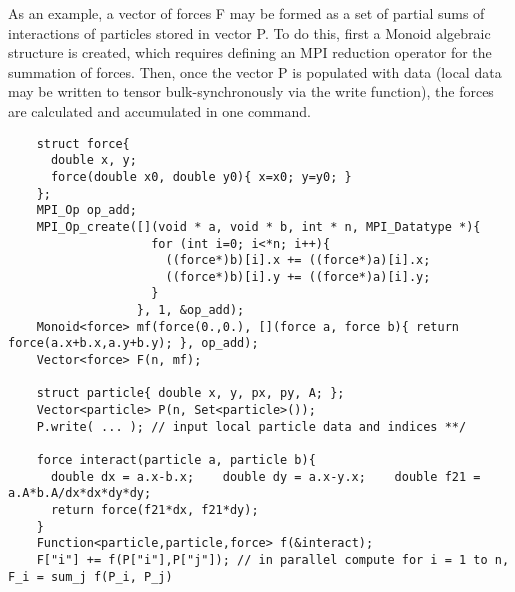 As an example, a vector of forces {\CD F} may be formed as a set of partial sums of interactions of particles stored in vector {\CD P}.
To do this, first a {\kwstyle Monoid} algebraic structure is created, which requires defining an MPI reduction operator for the summation of forces.
Then, once the vector {\CD P} is populated with data (local data may be written to tensor bulk-synchronously via the {\kwstyle write} function), the forces are calculated and accumulated in one command.
\begin{lstlisting}
    struct force{
      double x, y; 
      force(double x0, double y0){ x=x0; y=y0; }
    };
    MPI_Op op_add;
    MPI_Op_create([](void * a, void * b, int * n, MPI_Datatype *){
                    for (int i=0; i<*n; i++){
                      ((force*)b)[i].x += ((force*)a)[i].x;
                      ((force*)b)[i].y += ((force*)a)[i].y;
                    }
                  }, 1, &op_add);
    Monoid<force> mf(force(0.,0.), [](force a, force b){ return force(a.x+b.x,a.y+b.y); }, op_add);
    Vector<force> F(n, mf);
    
    struct particle{ double x, y, px, py, A; };
    Vector<particle> P(n, Set<particle>());
    P.write( ... ); // input local particle data and indices **/ 

    force interact(particle a, particle b){
      double dx = a.x-b.x;    double dy = a.x-y.x;    double f21 = a.A*b.A/dx*dx*dy*dy;
      return force(f21*dx, f21*dy);
    }
    Function<particle,particle,force> f(&interact);
    F["i"] += f(P["i"],P["j"]); // in parallel compute for i = 1 to n, F_i = sum_j f(P_i, P_j)
\end{lstlisting}

